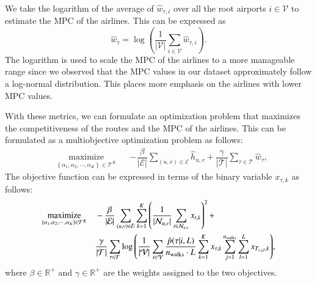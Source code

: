\documentclass[preprint,times]{elsarticle}
\def\mkhalil#1{{\color{black} #1}}
\begin{document}
We take the logarithm of the average of $\hat{w}_{\tau,i}$ over all the root \mkhalil{airport}s $i\in\mathcal{V}$ to estimate the \ac{MPC} of the airlines. This can be expressed as
%
\begin{equation} \label{eq:mpcestimatefinal}
\hat{w}_{\tau} = \log{\left(\dfrac{1}{\left|\mathcal{V}\right|}\sum_{i\in\mathcal{V}}\hat{w}_{\tau,i}\right)}.
\end{equation}
%
The logarithm is used to scale the \ac{MPC} of the airlines to a more manageable range since \mkhalil{we observed that the \ac{MPC} values in our dataset approximately follow a log-normal distribution.}
%
This places more emphasis on the airlines with lower \ac{MPC} values.

With these metrics, we can formulate an optimization problem that maximizes the competitiveness of the routes and the \ac{MPC} of the airlines. This can be formulated as a multiobjective optimization problem as follows:
%
\begin{equation*} \label{eq:analyticalobjectiveapprox}
\begin{aligned}
& \underset{\left\{\alpha_1,\alpha_2,\cdots,\alpha_K\right\}\in\mathcal{T}^K}{\text{maximize}}
& & -\dfrac{\beta}{\left|\mathcal{E}\right|}\sum_{\left(u,v\right) \in \mathcal{E}} \hat{h}_{u,v} + \dfrac{\gamma}{\left|\mathcal{T}\right|}\sum_{\tau\in\mathcal{T}}\hat{w}_{\tau},
\end{aligned}
\end{equation*}
%
The objective function can be expressed in terms of the binary variable $x_{\tau,k}$ as follows:
%
\begin{equation} \label{eq:analyticalestimate}
\begin{aligned}
& \underset{\left\{\alpha_1,\alpha_2,\cdots,\alpha_K\right\}\in\mathcal{T}^K}{\text{maximize}}
& & -\dfrac{\beta}{\left|\mathcal{E}\right|}\sum_{\left(u,v\right) \in \mathcal{E}}\sum_{k=1}^{K} \left( \frac{1}{|\mathcal{N}_{u,v}|} \sum_{t \in \mathcal{N}_{u,v}} \mkhalil{x_{t,k}} \right)^2 + \\
& & & \dfrac{\gamma}{\left|\mathcal{T}\right|}\sum_{\tau\in\mathcal{T}}\log{\left(\mkhalil{\dfrac{1}{\left|\mathcal{V}\right|}}\sum_{i\in\mathcal{V}} \dfrac{\hat{p}(\tau|i,L)}{n_\text{walks}\cdot L}\sum_{k=1}^{K}\mkhalil{x_{\tau,k}}\sum_{j=1}^{n_\text{walks}}\sum_{l=1}^{L}\mkhalil{x_{T_{i,j,l},k}}\right)},
\end{aligned}
\end{equation}
%
%
where $\beta \in \mathbb{R}^{+}$ and $\gamma \in \mathbb{R}^{+}$ are the weights assigned to the two objectives.
\end{document}
